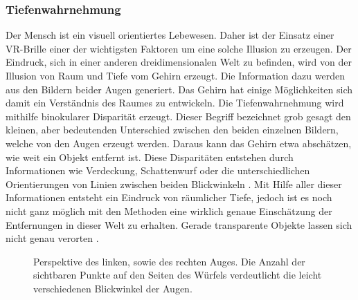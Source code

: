 \subsubsection{Tiefenwahrnehmung}


Der Mensch ist ein visuell orientiertes Lebewesen. Daher ist der Einsatz einer VR-Brille einer der wichtigsten
Faktoren um eine solche Illusion zu erzeugen. Der Eindruck, sich in einer anderen dreidimensionalen Welt zu befinden, 
wird von der Illusion von Raum und Tiefe vom Gehirn erzeugt.
Die Information dazu werden aus den Bildern beider Augen generiert.
Das Gehirn hat einige Möglichkeiten sich damit ein Verständnis des Raumes zu entwickeln.
Die Tiefenwahrnehmung wird mithilfe binokularer Disparität erzeugt. Dieser Begriff bezeichnet grob gesagt den kleinen, aber bedeutenden
Unterschied zwischen den beiden einzelnen Bildern, welche von den Augen erzeugt werden. Daraus kann das Gehirn etwa
abschätzen, wie weit ein Objekt entfernt ist.
Diese Disparitäten entstehen durch Informationen wie Verdeckung, Schattenwurf oder die unterschiedlichen Orientierungen von Linien zwischen
beiden Blickwinkeln \parencite{Tauer2010}. Mit Hilfe aller dieser Informationen entsteht ein Eindruck von räumlicher Tiefe, 
jedoch ist es noch nicht ganz möglich mit den Methoden eine wirklich genaue Einschätzung der Entfernungen in dieser Welt zu erhalten. 
Gerade transparente Objekte lassen sich nicht genau verorten \parencite{ElJamiy2019}.



\begin{figure}[h]
	\centering
	\begin{footnotesize}
		\caption{Perspektive des linken, sowie des rechten Auges. Die Anzahl der sichtbaren Punkte auf den Seiten des Würfels verdeutlicht die leicht verschiedenen Blickwinkel der Augen.}
	\end{footnotesize}
\end{figure}


